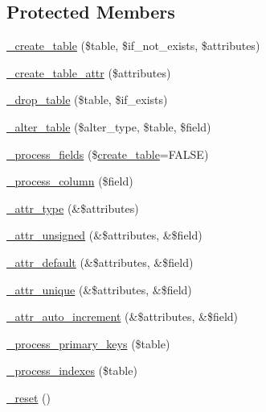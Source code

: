 \subsection*{Protected Members}
\begin{DoxyCompactItemize}
\item 
\mbox{\hyperlink{class_c_i___d_b__forge_a609e3ae24bd762e8d154f38a2ec7cfda}{\+\_\+create\+\_\+table}} (\$table, \$if\+\_\+not\+\_\+exists, \$attributes)
\item 
\mbox{\hyperlink{class_c_i___d_b__forge_a10b25326d82f6ddd9af1935e52e42b72}{\+\_\+create\+\_\+table\+\_\+attr}} (\$attributes)
\item 
\mbox{\hyperlink{class_c_i___d_b__forge_a1875c16d087f2c269fc3666f0488c4c8}{\+\_\+drop\+\_\+table}} (\$table, \$if\+\_\+exists)
\item 
\mbox{\hyperlink{class_c_i___d_b__forge_a41c6cae02f2fda8b429ad0afb9509426}{\+\_\+alter\+\_\+table}} (\$alter\+\_\+type, \$table, \$field)
\item 
\mbox{\hyperlink{class_c_i___d_b__forge_ae469322e7aad35ff5689973878175922}{\+\_\+process\+\_\+fields}} (\$\mbox{\hyperlink{class_c_i___d_b__forge_a0904375ba759fbe7961b424a46c0adae}{create\+\_\+table}}=F\+A\+L\+SE)
\item 
\mbox{\hyperlink{class_c_i___d_b__forge_a8f38f1c5b5dddecca4befbe393f3f299}{\+\_\+process\+\_\+column}} (\$field)
\item 
\mbox{\hyperlink{class_c_i___d_b__forge_a8553be952084c6f7cdfff370a1d14f6b}{\+\_\+attr\+\_\+type}} (\&\$attributes)
\item 
\mbox{\hyperlink{class_c_i___d_b__forge_aebcfa19bad617858b7d728ff4df87f2c}{\+\_\+attr\+\_\+unsigned}} (\&\$attributes, \&\$field)
\item 
\mbox{\hyperlink{class_c_i___d_b__forge_a033e9e430791efe4206512668ddf318e}{\+\_\+attr\+\_\+default}} (\&\$attributes, \&\$field)
\item 
\mbox{\hyperlink{class_c_i___d_b__forge_a7568a93ea53a7392a63fffe83bb7a090}{\+\_\+attr\+\_\+unique}} (\&\$attributes, \&\$field)
\item 
\mbox{\hyperlink{class_c_i___d_b__forge_a2a013a5932439c3c44f0dad3436525f7}{\+\_\+attr\+\_\+auto\+\_\+increment}} (\&\$attributes, \&\$field)
\item 
\mbox{\hyperlink{class_c_i___d_b__forge_a207c32e2b5c14364b2e33d2f15500b7e}{\+\_\+process\+\_\+primary\+\_\+keys}} (\$table)
\item 
\mbox{\hyperlink{class_c_i___d_b__forge_ae0bdb4ea3418590d1894c5b621b5ca50}{\+\_\+process\+\_\+indexes}} (\$table)
\item 
\mbox{\hyperlink{class_c_i___d_b__forge_ab90fa1f6f390913fed8670e6535dc180}{\+\_\+reset}} ()
\end{DoxyCompactItemize}
